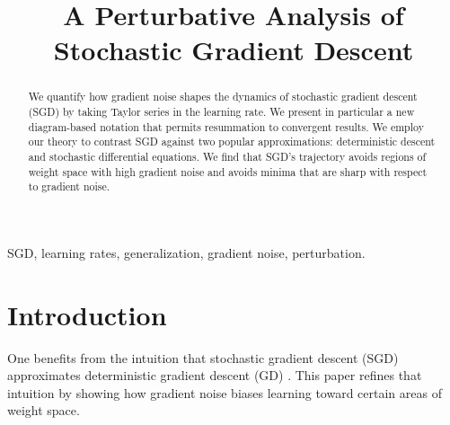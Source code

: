 \documentclass[anon,12pt]{colt2021} %
\title[A Perturbative Analysis of SGD]{
    A Perturbative Analysis of Stochastic Gradient Descent
}
\begin{document}
    \maketitle
    
    \begin{abstract}%
        We quantify how gradient noise shapes the dynamics of stochastic
        gradient descent (SGD) by taking Taylor series in the learning rate.
        We present in particular a new diagram-based notation that permits
        resummation to convergent results.
        We employ our theory to contrast SGD against two popular
        approximations: deterministic descent and stochastic differential
        equations.  We find that SGD's trajectory avoids regions of weight
        space with high gradient noise and avoids minima that are sharp with
        respect to gradient noise.
    \end{abstract}
    
    \begin{keywords}%
        SGD, learning rates, generalization, gradient noise, perturbation. 
    \end{keywords}

    \section{Introduction}


            One benefits from the intuition that stochastic gradient descent
            (SGD) approximates deterministic gradient descent (GD)
            \citep{bo91}.  This paper refines that intuition by showing how
            gradient noise biases learning toward certain areas of weight
            space.
\end{document}
